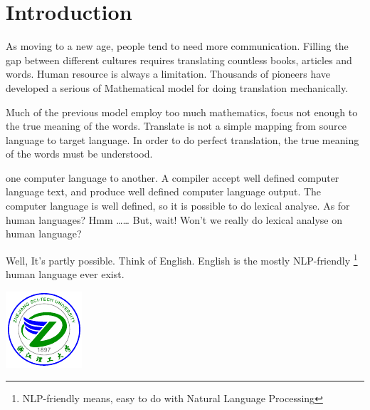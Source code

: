 \section{Introduction}

As moving to a new age, people tend to need more communication. Filling the gap
between different cultures requires translating countless books, articles and
words. Human resource is always a limitation. Thousands of pioneers have developed
a serious of Mathematical model for doing translation mechanically. 

Much of the previous model employ too much mathematics, focus not enough to the true meaning
of the words. Translate is not a simple mapping from source language to target language.
In order to do perfect translation, the true meaning of the words must be understood. 

one computer language to another. A compiler accept well defined computer language
text, and produce well defined computer language output. The computer language is well
defined, so it is possible to do lexical analyse. As for human languages? Hmm \ldots\ldots 
But, wait! Won't we really do lexical analyse on human language?

Well, It's partly possible. Think of English. English is the mostly
NLP-friendly \footnote{NLP-friendly means, easy to do with Natural Language Processing}
human language ever exist.

\includegraphics{zstu}
